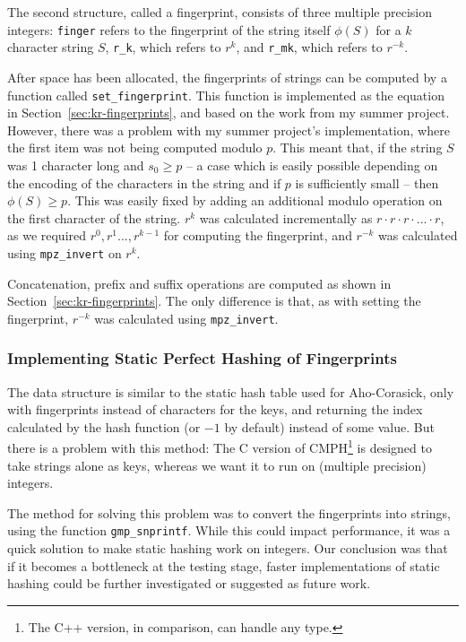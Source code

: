 \documentclass[ %
                    author={Dominic Joseph Moylett},
                    degree={MEng},
                     title={Dictionary Matching with Fingerprints},
                  subtitle={An Empirical Analysis},
                      type={research},
                      year={2015} ]{dissertation}
\begin{document}
The second structure, called a fingerprint, consists of three multiple precision integers: \texttt{finger} refers to the fingerprint of the string itself $\phi(S)$ for a $k$ character string $S$, \texttt{r\_k}, which refers to $r^k$, and \texttt{r\_mk}, which refers to $r^{-k}$.

After space has been allocated, the fingerprints of strings can be computed by a function called \texttt{set\_fingerprint}. This function is implemented as the equation in Section~\ref{sec:kr-fingerprints}, and based on the work from my summer project. However, there was a problem with my summer project's implementation, where the first item was not being computed modulo $p$. This meant that, if the string $S$ was 1 character long and $s_0 \geq p$ -- a case which is easily possible depending on the encoding of the characters in the string and if $p$ is sufficiently small -- then $\phi(S) \geq p$. This was easily fixed by adding an additional modulo operation on the first character of the string. $r^k$ was calculated incrementally as $r\cdot r\cdot r\cdot ...\cdot r$, as we required $r^0,r^1...,r^{k-1}$ for computing the fingerprint, and $r^{-k}$ was calculated using \texttt{mpz\_invert} on $r^k$.

Concatenation, prefix and suffix operations are computed as shown in Section~\ref{sec:kr-fingerprints}. The only difference is that, as with setting the fingerprint, $r^{-k}$ was calculated using \texttt{mpz\_invert}.

\subsubsection{Implementing Static Perfect Hashing of Fingerprints}
\label{sssec:static-hashing-kr}

The data structure is similar to the static hash table used for Aho-Corasick, only with fingerprints instead of characters for the keys, and returning the index calculated by the hash function (or $-1$ by default) instead of some value. But there is a problem with this method: The C version of CMPH\footnote{The C++ version, in comparison, can handle any type.} is designed to take strings alone as keys, whereas we want it to run on (multiple precision) integers.

The method for solving this problem was to convert the fingerprints into strings, using the function \texttt{gmp\_snprintf}. While this could impact performance, it was a quick solution to make static hashing work on integers. Our conclusion was that if it becomes a bottleneck at the testing stage, faster implementations of static hashing could be further investigated or suggested as future work.
\end{document}
